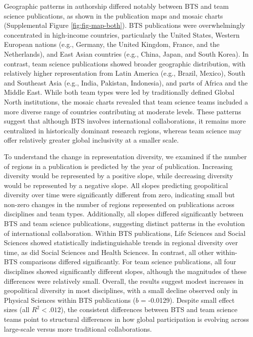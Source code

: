 \documentclass[
  man,floatsintext]{apa7}
\begin{document}
Geographic patterns in authorship differed notably between BTS and team
science publications, as shown in the publication maps and mosaic charts
(Supplemental Figure \ref{fig:fig-map-both}). BTS publications were overwhelmingly
concentrated in high-income countries, particularly the United States,
Western European nations (e.g., Germany, the United Kingdom, France, and
the Netherlands), and East Asian countries (e.g., China, Japan, and
South Korea). In contrast, team science publications showed broader
geographic distribution, with relatively higher representation from
Latin America (e.g., Brazil, Mexico), South and Southeast Asia (e.g.,
India, Pakistan, Indonesia), and parts of Africa and the Middle East.
While both team types were led by traditionally defined Global North
institutions, the mosaic charts revealed that team science teams
included a more diverse range of countries contributing at moderate
levels. These patterns suggest that although BTS involves international
collaborations, it remains more centralized in historically dominant
research regions, whereas team science may offer relatively greater
global inclusivity at a smaller scale.

To understand the change in representation diversity, we examined if the
number of regions in a publication is predicted by the year of
publication. Increasing diversity would be represented by a positive
slope, while decreasing diversity would be represented by a negative
slope. All slopes predicting geopolitical diversity over time were
significantly different from zero, indicating small but non-zero changes
in the number of regions represented on publications across disciplines
and team types. Additionally, all slopes differed significantly between
BTS and team science publications, suggesting distinct patterns in the
evolution of international collaboration. Within BTS publications, Life
Sciences and Social Sciences showed statistically indistinguishable
trends in regional diversity over time, as did Social Sciences and
Health Sciences. In contrast, all other within-BTS comparisons differed
significantly. For team science publications, all four disciplines
showed significantly different slopes, although the magnitudes of these
differences were relatively small. Overall, the results suggest modest
increases in geopolitical diversity in most disciplines, with a small
decline observed only in Physical Sciences within BTS publications (\(b\)
= -0.0129). Despite small effect sizes (all \(R^2 < .012\)), the
consistent differences between BTS and team science teams point to
structural differences in how global participation is evolving across
large-scale versus more traditional collaborations.
\end{document}
